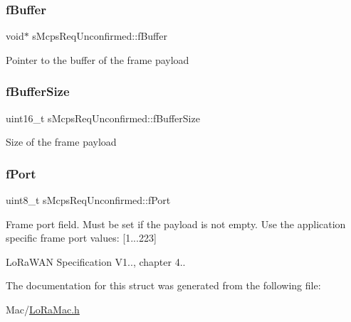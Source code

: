 \subsubsection{\texorpdfstring{f\+Buffer}{fBuffer}}
{\footnotesize\ttfamily void$\ast$ s\+Mcps\+Req\+Unconfirmed\+::f\+Buffer}

Pointer to the buffer of the frame payload \mbox{\label{structsMcpsReqUnconfirmed_a0e3cfa4780e696a8e262d1f8f9f5fec4}} 
\subsubsection{\texorpdfstring{f\+Buffer\+Size}{fBufferSize}}
{\footnotesize\ttfamily uint16\+\_\+t s\+Mcps\+Req\+Unconfirmed\+::f\+Buffer\+Size}

Size of the frame payload \mbox{\label{structsMcpsReqUnconfirmed_a3c0190f7a5cc179b8cd664ff6a57169e}} 
\subsubsection{\texorpdfstring{f\+Port}{fPort}}
{\footnotesize\ttfamily uint8\+\_\+t s\+Mcps\+Req\+Unconfirmed\+::f\+Port}

Frame port field. Must be set if the payload is not empty. Use the application specific frame port values\+: \mbox{[}1...223\mbox{]}

Lo\+Ra\+W\+AN Specification V1.., chapter 4.. 

The documentation for this struct was generated from the following file\+:\begin{DoxyCompactItemize}
\item 
Mac/\hyperlink{LoRaMac_8h}{Lo\+Ra\+Mac.\+h}\end{DoxyCompactItemize}
